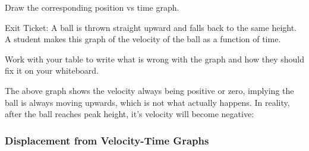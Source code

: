 \documentclass[]{exam}
\begin{document}
\begin{questions}
Draw the corresponding position vs time graph.



\question 
Exit Ticket: A ball is thrown straight upward and falls back to the same height. A student makes this graph of the velocity of the ball as a function of time. 

\begin{center}
\end{center}

Work with your table to write what is wrong with the graph and how they should fix it on your whiteboard.

\begin{solution}
    The above graph shows the velocity always being positive or zero, implying the ball is always moving upwards, which is not what actually happens. In reality, after the ball reaches peak height, it's velocity will become negative:

    \begin{center}
    \end{center}    
\end{solution}

\end{questions}


\clearpage

\subsubsection{Displacement from Velocity-Time Graphs}
\end{document}
